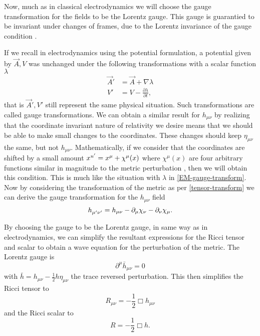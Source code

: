 Now, much as in classical electrodynamics we will choose the gauge transformation for the fields to be the Lorentz gauge. This gauge is guarantied to be invariant under changes of frames, due to the Lorentz invariance of the gauge condition \cite{griffiths}. 

If we recall in electrodynamics using the potential formulation, a potential given by \(\vec{A}, V\) was unchanged under the following transformations with a scalar function \(\lambda\) \cite{griffiths}
\begin{equation} \label{EM-gauge-transform}
	\begin{aligned}
		\vec{A}' &= \vec{A} + \nabla \lambda \\
		V' &= V - \frac{\partial \lambda}{\partial t} ,
	\end{aligned}
\end{equation}
that is \(\vec{A}', V'\) still represent the same physical situation. Such transformations are called gauge transformations. We can obtain a similar result for \(h_{\mu \nu}\) by realizing that the coordinate invariant nature of relativity we desire means that we should be able to make small changes to the coordinates. These changes should keep \(\eta_{\mu \nu}\) the same, but not \(h_{\mu \nu}\). Mathematically, if we consider that the coordinates are shifted by a small amount \(x\indices{^{u'}} = x^{\mu} + \chi^{\mu} (x)\) where \(\chi^{\mu} (x)\) are four arbitrary functions similar in magnitude to the metric perturbation \cite{hartle}, then we will obtain this condition. This is much like the situation with \(\lambda\) in \eqref{EM-gauge-transform}. Now by considering the transformation of the metric as per \eqref{tensor-transform} we can derive the gauge transformation for the \(h_{\mu \nu}\) field \cite{cheng}
\begin{equation} \label{linear-gauge-transform}
	h\indices{_{\mu'}_{\nu'}} = h_{\mu \nu} - \partial_{\mu} \chi_{\nu} - \partial_{\nu} \chi_{\mu} .
\end{equation}

By choosing the gauge to be the Lorentz gauge, in same way as in electrodynamics, we can simplify the resultant expressions for the Ricci tensor and scalar to obtain a wave equation for the perturbation of the metric. The Lorentz gauge is
\begin{equation} \label{lorentz-gauge}
	\partial^{\mu} \bar{h}_{\mu \nu} = 0
\end{equation}
with \(\bar{h} = h_{\mu \nu} - \frac{1}{2} h \eta_{\mu \nu}\) the trace reversed perturbation. This then simplifies the Ricci tensor to
\begin{equation} \label{ricci-gauge}
	R_{\mu \nu} = - \frac{1}{2} \Box h_{\mu \nu}
\end{equation}
and the Ricci scalar to
\begin{equation} \label{ricci-scalar-gauge}
	R = - \frac{1}{2} \Box h .
\end{equation}

